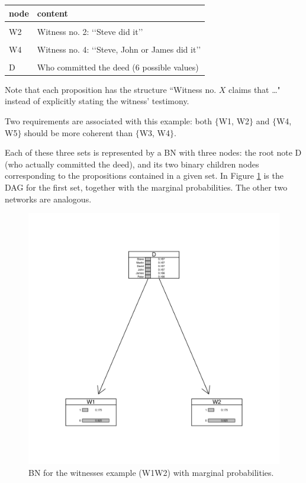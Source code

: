 \documentclass[10pt,]{scrartcl}
\begin{document}
\begin{table}[H]
\centering
\begin{tabular}{ll}
\toprule
node & content\\
\midrule
\cellcolor{gray!6}{W1} & \cellcolor{gray!6}{Witness no. 1: ‘‘Steve did it’’}\\
W2 & Witness no. 2: ‘‘Steve did it’’\\
\cellcolor{gray!6}{W3} & \cellcolor{gray!6}{Witness no. 3: ‘‘Steve, Martin or David did it’’}\\
W4 & Witness no. 4: ‘‘Steve, John or James did it’’\\
\cellcolor{gray!6}{W5} & \cellcolor{gray!6}{Wittness no. 5: ‘‘Steve, John or Peter did it’’}\\
D & Who committed the deed (6  possible values)\\
\bottomrule
\end{tabular}
\end{table}

Note that  each proposition has the structure ``Witness no.
\(X\) claims that \dots" instead of explicitly stating the witness'
testimony.

Two requirements are associated with this example: both
\(\{\)\textsf{W1, W2}\(\}\) and \(\{\)\textsf{W4, W5}\(\}\) should be
more coherent than \(\{\)\textsf{W3, W4}\(\}\).

Each of these three sets is represented by a BN with three nodes: the root note \textsf{D} (who actually committed the deed), and its two binary children nodes corresponding to the propositions contained in a given set. In Figure \ref{fig:witnessw1w2} is the DAG for the first set, together with the marginal probabilities. The other two networks are analogous.

\begin{figure}[h]
\hspace{10mm}
\includegraphics[width =12cm]{w1w2BNv2.png}
\caption{BN for the witnesses example (W1W2) with marginal probabilities.}
\label{fig:witnessw1w2}
\end{figure}
\end{document}
